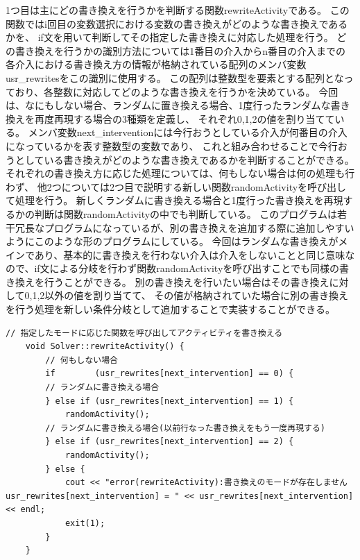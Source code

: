 1つ目は主にどの書き換えを行うかを判断する関数rewriteActivityである。
この関数ではi回目の変数選択における変数の書き換えがどのような書き換えであるかを、
if文を用いて判断してその指定した書き換えに対応した処理を行う。
どの書き換えを行うかの識別方法については1番目の介入からn番目の介入までの各介入における書き換え方の情報が格納されている配列のメンバ変数usr\_rewritesをこの識別に使用する。
この配列は整数型を要素とする配列となっており、各整数に対応してどのような書き換えを行うかを決めている。
今回は、なにもしない場合、ランダムに置き換える場合、1度行ったランダムな書き換えを再度再現する場合の3種類を定義し、
それぞれ0,1,2の値を割り当てている。
メンバ変数next\_interventionには今行おうとしている介入が何番目の介入になっているかを表す整数型の変数であり、
これと組み合わせることで今行おうとしている書き換えがどのような書き換えであるかを判断することができる。
それぞれの書き換え方に応じた処理については、何もしない場合は何の処理も行わず、
他2つについては2つ目で説明する新しい関数randomActivityを呼び出して処理を行う。
新しくランダムに書き換える場合と1度行った書き換えを再現するかの判断は関数randomActivityの中でも判断している。
このプログラムは若干冗長なプログラムになっているが、別の書き換えを追加する際に追加しやすいようにこのような形のプログラムにしている。
今回はランダムな書き換えがメインであり、基本的に書き換えを行わない介入は介入をしないことと同じ意味なので、if文による分岐を行わず関数randomActivityを呼び出すことでも同様の書き換えを行うことができる。
別の書き換えを行いたい場合はその書き換えに対して0,1,2以外の値を割り当てて、
その値が格納されていた場合に別の書き換えを行う処理を新しい条件分岐として追加することで実装することができる。
\begin{lstlisting}[caption=関数rewriteActivity(core/Solver.cc)]
	// 指定したモードに応じた関数を呼び出してアクティビティを書き換える
	void Solver::rewriteActivity() {
    	// 何もしない場合
    	if        (usr_rewrites[next_intervention] == 0) {
		// ランダムに書き換える場合
    	} else if (usr_rewrites[next_intervention] == 1) {
    	    randomActivity();
		// ランダムに書き換える場合(以前行なった書き換えをもう一度再現する)
    	} else if (usr_rewrites[next_intervention] == 2) {
    	    randomActivity();
    	} else {
    	    cout << "error(rewriteActivity):書き換えのモードが存在しません usr_rewrites[next_intervention] = " << usr_rewrites[next_intervention] << endl;
    	    exit(1);
    	}
	}
\end{lstlisting}

